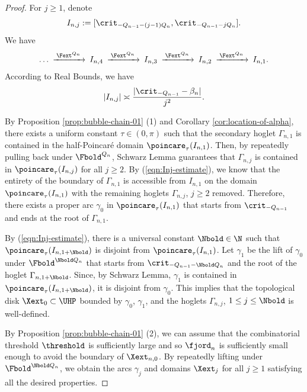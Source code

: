 \documentclass{amsart}
\begin{document}
\begin{proof}
    For $j \geq 1$, denote 
        \[
        I_{n,j} := [\crit_{-Q_{n-1}-(j-1)Q_n},\crit_{-Q_{n-1}-jQ_n}].
        \]
    We have
        \[
            \ldots \: \xrightarrow[]{\: \Fext^{Q_n} \:} \:  I_{n,4}
            \: \xrightarrow[]{\: \Fext^{Q_n} \:} \:  I_{n,3}
            \: \xrightarrow[]{\: \Fext^{Q_n} \:} \:  I_{n,2}
            \: \xrightarrow[]{\: \Fext^{Q_n} \:} \: I_{n,1}.
        \]
    According to Real Bounds, we have
        \begin{align}
        \label{eqn:Inj-estimate}
            |I_{n,j}| \asymp \frac{|\crit_{-Q_{n-1}}-\beta_n|}{j^2}.
        \end{align}
        
    By Proposition \ref{prop:bubble-chain-01} (1) and Corollary \ref{cor:location-of-alpha},
    there exists a uniform constant $\tau\in (0,\pi)$ such that the secondary hoglet $\Gamma_{n,1}$ is contained in the half-Poincar\'e domain $\poincare_{\tau}(I_{n,1})$.
    Then, by repeatedly pulling back under $\Fbold^{Q_n}$, Schwarz Lemma guarantees that $\Gamma_{n,j}$ is contained in $\poincare_{\tau}(I_{n,j})$ for all $j \geq 2$.
    By (\ref{eqn:Inj-estimate}), we know that the entirety of the boundary of $\Gamma_{n,1}$ is accessible from $I_{n,1}$ on the domain $\poincare_{\tau}(I_{n,1})$ with the remaining hoglets $\Gamma_{n,j}$, $j \geq 2$ removed.
    Therefore, there exists a proper arc $\gamma_0$ in $\poincare_{\tau}(I_{n,1})$ that starts from $\crit_{-Q_{n-1}}$ and ends at the root of $\Gamma_{n,1}$.

    By (\ref{eqn:Inj-estimate}), there is a universal constant $\Nbold  \in \N$ such that $\poincare_{\tau}(I_{n,1+\Nbold })$ is disjoint from $\poincare_{\tau}(I_{n,1})$.
    Let $\gamma_1$ be the lift of $\gamma_0$ under $\Fbold^{\Nbold Q_n}$ that starts from $\crit_{-Q_{n-1}-\Nbold Q_n}$ and the root of the hoglet $\Gamma_{n,1+\Nbold }$.
    Since, by Schwarz Lemma, $\gamma_1$ is contained in $\poincare_{\tau}(I_{n,1+\Nbold })$, it is disjoint from $\gamma_0$.
    This implies that the topological disk $\Xext_0 \subset \UHP$ bounded by $\gamma_0$, $\gamma_1$, and the hoglets $\Gamma_{n,j}$, $1\leq j \leq \Nbold $ is well-defined.

    By Proposition \ref{prop:bubble-chain-01} (2), we can assume that the combinatorial threshold $\threshold$ is sufficiently large and so $\fjord_n$ is sufficiently small enough to avoid the boundary of $\Xext_{n,0}$.
    By repeatedly lifting under $\Fbold^{\Nbold  Q_n}$, 
    we obtain the arcs $\gamma_j$ and domains $\Xext_j$ for all $j \geq 1$ satisfying all the desired properties.
\end{proof}
\end{document}
